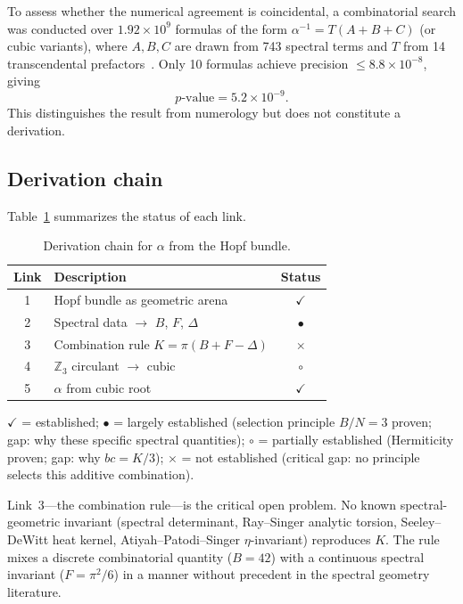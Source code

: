 \documentclass[aps,pra,twocolumn,superscriptaddress,longbibliography]{revtex4-2}
\begin{document}
To assess whether the numerical agreement is coincidental, a
combinatorial search was conducted over $1.92 \times 10^9$ formulas of
the form $\alpha^{-1} = T(A + B + C)$ (or cubic variants), where
$A, B, C$ are drawn from 743 spectral terms and $T$ from 14
transcendental prefactors~\cite{Paper2}.  Only 10 formulas achieve
precision $\leq 8.8 \times 10^{-8}$, giving
\begin{equation}
p\text{-value} = 5.2 \times 10^{-9}.
\label{eq:pvalue}
\end{equation}
This distinguishes the result from numerology but does not constitute a
derivation.

\subsection{Derivation chain}

Table~\ref{tab:chain} summarizes the status of each link.

\begin{table}[t]
\caption{Derivation chain for $\alpha$ from the Hopf bundle.}
\label{tab:chain}
\begin{ruledtabular}
\begin{tabular}{clc}
Link & Description & Status \\
\hline
1 & Hopf bundle as geometric arena & $\checkmark$ \\
2 & Spectral data $\to$ $B$, $F$, $\Delta$ & $\bullet$ \\
3 & Combination rule $K = \pi(B+F-\Delta)$ & $\times$ \\
4 & $\mathbb{Z}_3$ circulant $\to$ cubic & $\circ$ \\
5 & $\alpha$ from cubic root & $\checkmark$ \\
\end{tabular}
\end{ruledtabular}
\begin{flushleft}
$\checkmark$ = established; $\bullet$ = largely established
(selection principle $B/N = 3$ proven; gap: why these specific
spectral quantities); $\circ$ = partially established (Hermiticity
proven; gap: why $bc = K/3$); $\times$ = not established (critical
gap: no principle selects this additive combination).
\end{flushleft}
\end{table}

Link~3---the combination rule---is the critical open problem.  No
known spectral-geometric invariant (spectral determinant, Ray--Singer
analytic torsion, Seeley--DeWitt heat kernel, Atiyah--Patodi--Singer
$\eta$-invariant) reproduces $K$.  The rule mixes a discrete
combinatorial quantity ($B = 42$) with a continuous spectral invariant
($F = \pi^2/6$) in a manner without precedent in the spectral geometry
literature.
\end{document}
